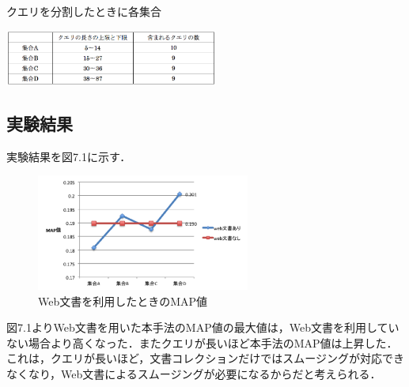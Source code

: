 \begin{table}
    \centering
    \caption{クエリを分割したときに各集合}
    \includegraphics[width=7cm]{./image/query_set.png}
    \label{query_set}
\end{table}

\subsection{実験結果}
実験結果を図7.1に示す．

\begin{figure}
    \centering
    \includegraphics[width=7cm]{./image/web_result.png}
    \caption{Web文書を利用したときのMAP値}
    \label{web_result1}
\end{figure}

図7.1よりWeb文書を用いた本手法のMAP値の最大値は，Web文書を利用していない場合より高くなった．またクエリが長いほど本手法のMAP値は上昇した．これは，クエリが長いほど，文書コレクションだけではスムージングが対応できなくなり，Web文書によるスムージングが必要になるからだと考えられる．
